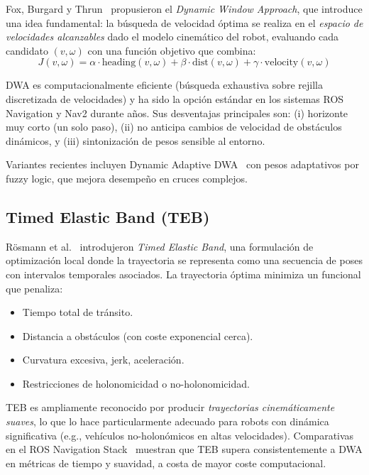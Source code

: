 \documentclass[12pt,a4paper,oneside]{book}
\begin{document}
Fox, Burgard y Thrun~\cite{Fox1997} propusieron el \emph{Dynamic Window Approach}, que introduce una idea fundamental: la búsqueda de velocidad óptima se realiza en el \emph{espacio de velocidades alcanzables} dado el modelo cinemático del robot, evaluando cada candidato $(v, \omega)$ con una función objetivo que combina:
\begin{equation}
J(v,\omega) = \alpha \cdot \text{heading}(v,\omega) + \beta \cdot \text{dist}(v,\omega) + \gamma \cdot \text{velocity}(v,\omega)
\end{equation}

DWA es computacionalmente eficiente (búsqueda exhaustiva sobre rejilla discretizada de velocidades) y ha sido la opción estándar en los sistemas ROS Navigation y Nav2 durante años. Sus desventajas principales son: (i) horizonte muy corto (un solo paso), (ii) no anticipa cambios de velocidad de obstáculos dinámicos, y (iii) sintonización de pesos sensible al entorno.

Variantes recientes incluyen Dynamic Adaptive DWA~\cite{Liang2024} con pesos adaptativos por fuzzy logic, que mejora desempeño en cruces complejos.

\subsection{Timed Elastic Band (TEB)}

Rösmann et al.~\cite{Rosmann2012,Rosmann2017} introdujeron \emph{Timed Elastic Band}, una formulación de optimización local donde la trayectoria se representa como una secuencia de poses con intervalos temporales asociados. La trayectoria óptima minimiza un funcional que penaliza:
\begin{itemize}
    \item Tiempo total de tránsito.
    \item Distancia a obstáculos (con coste exponencial cerca).
    \item Curvatura excesiva, jerk, aceleración.
    \item Restricciones de holonomicidad o no-holonomicidad.
\end{itemize}

TEB es ampliamente reconocido por producir \emph{trayectorias cinemáticamente suaves}, lo que lo hace particularmente adecuado para robots con dinámica significativa (e.g., vehículos no-holonómicos en altas velocidades). Comparativas en el ROS Navigation Stack~\cite{Bermudez2024,Yuan2022} muestran que TEB supera consistentemente a DWA en métricas de tiempo y suavidad, a costa de mayor coste computacional.
\end{document}

